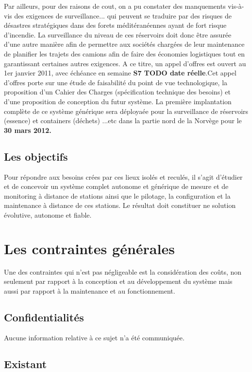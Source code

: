 Par ailleurs, pour des raisons de cout, on a pu constater des manquements vis-à-vis des exigences de surveillance... qui peuvent se traduire par des risques de désastres stratégiques dans des forets méditéranéennes ayant
de fort risque d'incendie.
La surveillance du niveau de ces réservoirs doit donc être assurée d'une autre manière afin de permettre aux sociétés chargées de leur maintenance de planifier les trajets des camions
afin de faire des économies logistiques tout en garantissant certaines autres exigences.
A ce titre, un appel d'offres est ouvert au 1er janvier 2011, avec échéance en semaine \textbf{S7 TODO date réelle}.Cet appel d'offres porte sur une étude
de faisabilité du point de vue technologique, la proposition d'un Cahier des Charges (spécification technique des besoins) et d'une proposition 
de conception du futur système.
La première implantation complète de ce système générique sera déployaée pour la surveillance de réservoirs (essence) et containers (déchets) ...etc
dans la partie nord de la Norvège pour le \textbf{30 mars 2012.}
\subsection{Les objectifs}
Pour répondre aux besoins crées par ces lieux isolés et reculés, il s'agit d'étudier et de concevoir un système complet autonome et générique de mesure et de monitoring à distance de stations ainsi 
que le pilotage, la configuration et la maintenance à distance de ces stations. Le résultat doit constituer ne solution évolutive, autonome et fiable.
\section{Les contraintes générales}
Une des contraintes qui n'est pas négligeable est la considération des coûts, non seulement par rapport à la conception et au développement du système
mais aussi par rapport à la maintenance et au fonctionnement.
\subsection{Confidentialités}
Aucune information relative à ce sujet n'a été communiquée.
\subsection{Existant}

